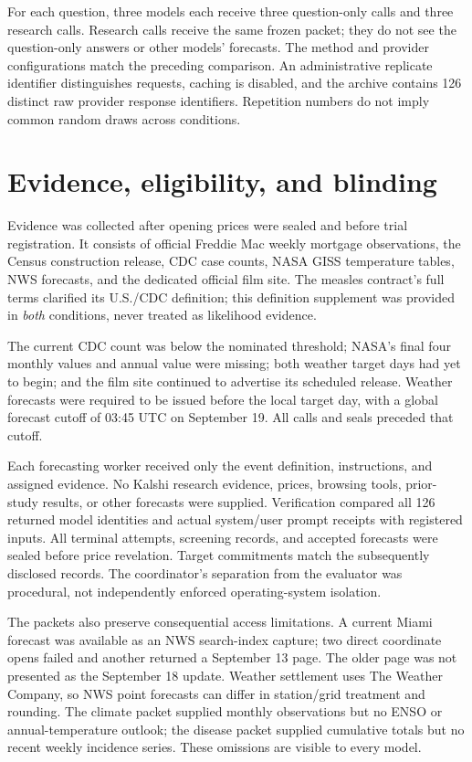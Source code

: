 \documentclass[11pt]{article}
\begin{document}
For each question, three models each receive three question-only calls and
three research calls. Research calls receive the same frozen packet; they do
not see the question-only answers or other models' forecasts. The method and
provider configurations match the preceding comparison. An administrative
replicate identifier distinguishes requests, caching is disabled, and the
archive contains 126 distinct raw provider response identifiers. Repetition
numbers do not imply common random draws across conditions.

\section{Evidence, eligibility, and blinding}
Evidence was collected after opening prices were sealed and before trial
registration. It consists of official Freddie Mac weekly mortgage observations,
the Census construction release, CDC case counts, NASA GISS temperature tables,
NWS forecasts, and the dedicated official film site. The measles contract's
full terms clarified its U.S./CDC definition; this definition supplement was
provided in \emph{both} conditions, never treated as likelihood evidence.

The current CDC count was below the nominated threshold; NASA's final four
monthly values and annual value were missing; both weather target days had yet
to begin; and the film site continued to advertise its scheduled release.
Weather forecasts were required to be issued before the local target day,
with a global forecast cutoff of 03:45 UTC on September 19. All calls and seals
preceded that cutoff.

Each forecasting worker received only the event definition, instructions,
and assigned evidence. No Kalshi research evidence, prices, browsing tools,
prior-study results, or other forecasts were supplied. Verification compared
all 126 returned model identities and actual system/user prompt receipts with
registered inputs. All terminal attempts, screening records, and accepted
forecasts were sealed before price revelation. Target commitments match the
subsequently disclosed records. The coordinator's separation from the evaluator
was procedural, not independently enforced operating-system isolation.

The packets also preserve consequential access limitations. A current Miami
forecast was available as an NWS search-index capture; two direct coordinate
opens failed and another returned a September 13 page. The older page was not
presented as the September 18 update. Weather settlement uses The Weather
Company, so NWS point forecasts can differ in station/grid treatment and
rounding. The climate packet supplied monthly observations but no ENSO or
annual-temperature outlook; the disease packet supplied cumulative totals but
no recent weekly incidence series. These omissions are visible to every model.
\end{document}
